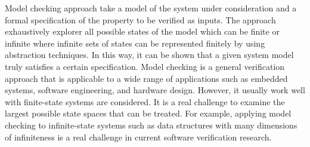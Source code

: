 Model checking approach take a model of the system under
consideration and a formal specification of the property to be verified as inputs. The approach exhaustively explorer all possible states of the model which can be finite or infinite where infinite sets of states can be represented finitely by using abstraction techniques. In this way, it can be shown that a given system model truly satisfies a certain specification. Model checking is a general verification approach that is applicable to a wide range of applications
such as embedded systems, software engineering, and hardware design. However, it usually work well with finite-state systems are considered. It is a real challenge to examine the largest possible state spaces that can be treated. For example, applying model checking to infinite-state systems such as data structures with many dimensions of infiniteness is a real challenge in current software verification research. 

